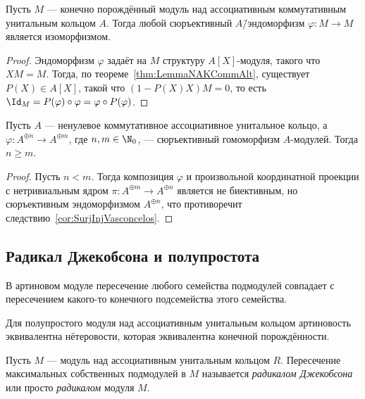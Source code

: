 \documentclass[
	extrafontsizes,
	11pt,
	hyphens,
]{memoir}
\begin{document}
\begin{corollary}
Пусть \(M\) --- конечно порождённый модуль над ассоциативным коммутативным унитальным кольцом \(A\).%
\label{cor:SurjInjVasconcelos}
Тогда любой сюръективный \(A\)\=/эндоморфизм \(\varphi: M \to M\) является изоморфизмом.
\end{corollary}

\begin{proof}
Эндоморфизм \(\varphi\) задаёт на \(M\) структуру \(A[X]\)-мо\-ду\-ля, такого что \(XM = M\).
Тогда, по теореме~\ref{thm:LemmaNAKCommAlt}, существует \(P(X) \in A[X]\), такой что \((1-P(X)X)M = 0\), то есть \(\Id_M = P(\varphi) \circ \varphi = \varphi \circ P(\varphi)\).
\end{proof}

\begin{corollary}
Пусть \(A\) --- ненулевое коммутативное ассоциативное унитальное кольцо, а \(\varphi : A^{\oplus n} \to A^{\oplus m}\), где \(n,m \in \N_0\), --- сюръективный гомоморфизм \(A\)-модулей. Тогда \(n \geq m\).
\end{corollary}

\begin{proof}
Пусть \(n < m\). Тогда композиция \(\varphi\) и произвольной координатной проекции с нетривиальным ядром \(\pi : A^{\oplus m} \to A^{\oplus n}\) является не биективным, но сюръективным эндоморфизмом \(A^{\oplus n}\), что противоречит следствию~\ref{cor:SurjInjVasconcelos}.
\end{proof}

\subsection{Радикал Джекобсона и полупростота}

\begin{observation}
\label{obs:ArtinFamilyInter}
В артиновом модуле пересечение любого семейства подмодулей совпадает с пересечением какого-то конечного подсемейства этого семейства.
\end{observation}

\begin{observation}%
\label{obs:SemisArtinNoether}
Для полупростого модуля над ассоциативным унитальным кольцом артиновость эквивалентна нётеровости, которая эквивалентна конечной порождённости.
\end{observation}

\begin{definition}
Пусть \(M\) --- модуль над ассоциативным унитальным кольцом \(R\). Пересечение максимальных собственных подмодулей в \(M\) называется \emph{радикалом Джекобсона} или просто \emph{радикалом} модуля \(M\).
\end{definition}
\end{document}
